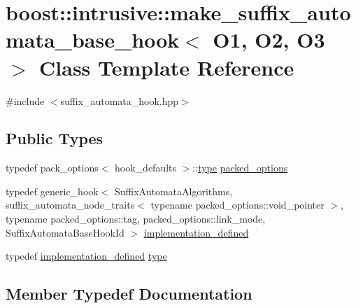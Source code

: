 \hypertarget{classboost_1_1intrusive_1_1make__suffix__automata__base__hook}{}\section{boost\+:\+:intrusive\+:\+:make\+\_\+suffix\+\_\+automata\+\_\+base\+\_\+hook$<$ O1, O2, O3 $>$ Class Template Reference}
\label{classboost_1_1intrusive_1_1make__suffix__automata__base__hook}


{\ttfamily \#include $<$suffix\+\_\+automata\+\_\+hook.\+hpp$>$}

\subsection*{Public Types}
\begin{DoxyCompactItemize}
\item 
typedef pack\+\_\+options$<$ hook\+\_\+defaults $>$\+::\hyperlink{classboost_1_1intrusive_1_1make__suffix__automata__base__hook_a3fbc0981de4bc6f6e162259d87cfa3aa}{type} \hyperlink{classboost_1_1intrusive_1_1make__suffix__automata__base__hook_af169eb92a361f67464ec4beb9ff5a314}{packed\+\_\+options}
\item 
typedef generic\+\_\+hook$<$ Suffix\+Automata\+Algorithms, suffix\+\_\+automata\+\_\+node\+\_\+traits$<$ typename packed\+\_\+options\+::void\+\_\+pointer $>$, typename packed\+\_\+options\+::tag, packed\+\_\+options\+::link\+\_\+mode, Suffix\+Automata\+Base\+Hook\+Id $>$ \hyperlink{classboost_1_1intrusive_1_1make__suffix__automata__base__hook_a8b3a0f3343ae07dbe98811acc5c67d10}{implementation\+\_\+defined}
\item 
typedef \hyperlink{classboost_1_1intrusive_1_1make__suffix__automata__base__hook_a8b3a0f3343ae07dbe98811acc5c67d10}{implementation\+\_\+defined} \hyperlink{classboost_1_1intrusive_1_1make__suffix__automata__base__hook_a3fbc0981de4bc6f6e162259d87cfa3aa}{type}
\end{DoxyCompactItemize}


\subsection{Member Typedef Documentation}
\mbox{\label{classboost_1_1intrusive_1_1make__suffix__automata__base__hook_a8b3a0f3343ae07dbe98811acc5c67d10}} 
